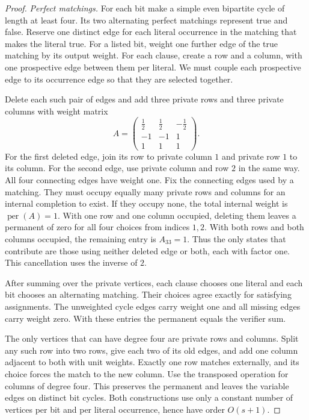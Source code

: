 \begin{proof}
\smallskip\noindent\emph{Perfect matchings.}
For each bit make a simple even bipartite cycle of length at least four.
Its two alternating perfect matchings represent true and false. Reserve
one distinct edge for each literal occurrence in the matching that makes
the literal true. For a listed bit, weight one further edge of the true
matching by its output weight. For each clause, create a row and a
column, with one prospective edge between them per literal. We must
couple each prospective edge to its occurrence edge so that they are
selected together.

Delete each such pair of edges and add three private rows and three
private columns with weight matrix
\[
  A=\begin{pmatrix}
     \tfrac12&\tfrac12&-\tfrac12\\
     -1&-1&1\\
     1&1&1
  \end{pmatrix}.
\]
For the first deleted edge, join its row to private column $1$ and
private row $1$ to its column. For the second edge, use private column
and row $2$ in the same way. All four connecting edges have weight one.
Fix the connecting edges used by a matching. They must occupy equally
many private rows and columns for an internal completion to exist. If
they occupy none, the total internal weight is $\operatorname{per}(A)=1$. With
one row and one column occupied, deleting them leaves a permanent of
zero for all four choices from indices $1,2$. With both rows and both
columns occupied, the remaining entry is $A_{33}=1$. Thus the only
states that contribute are those using neither deleted edge or both,
each with factor one. This cancellation uses the inverse of $2$.

After summing over the private vertices, each clause chooses one literal
and each bit chooses an alternating matching. Their choices agree
exactly for satisfying assignments. The unweighted cycle edges carry
weight one and all missing edges carry weight zero. With these entries
the permanent equals the verifier sum.

The only vertices that can have degree four are private rows and columns.
Split any such row into two rows, give each two of its old edges, and
add one column adjacent to both with unit weights. Exactly one row
matches externally, and its choice forces the match to the new column.
Use the transposed operation for columns of degree four. This preserves
the permanent and leaves the variable edges on distinct bit cycles.
Both constructions use only a constant number of vertices per bit and
per literal occurrence, hence have order $O(s+1)$.
\end{proof}
